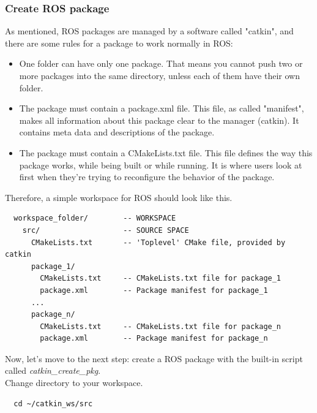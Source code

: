 \documentclass[pdftex,12pt,a4paper]{article}
\begin{document}
  \subsubsection{Create ROS package}  
  As mentioned, ROS packages are managed by a software called "catkin", and there are some rules for a package to work normally in ROS:
  \begin{itemize}
  \item One folder can have only one package. That means you cannot push two or more packages into the same directory, unless each of them have their own folder.
  \item The package must contain a package.xml file. This file, as called "manifest", makes all information about this package clear to the manager (catkin). It contains meta data and descriptions of the package.
  \item The package must contain a CMakeLists.txt file. This file defines the way this package works, while being built or while running. It is where users look at first when they're trying to reconfigure the behavior of the package.
  \end{itemize}
  Therefore, a simple workspace for ROS should look like this.
  \begin{lstlisting}
  workspace_folder/        -- WORKSPACE
    src/                   -- SOURCE SPACE
      CMakeLists.txt       -- 'Toplevel' CMake file, provided by catkin
      package_1/
        CMakeLists.txt     -- CMakeLists.txt file for package_1
        package.xml        -- Package manifest for package_1
      ...
      package_n/
        CMakeLists.txt     -- CMakeLists.txt file for package_n
        package.xml        -- Package manifest for package_n
  \end{lstlisting}
  Now, let's move to the next step: create a ROS package with the built-in script called \textit{catkin\_create\_pkg}.\\
  Change directory to your workspace.
  \begin{lstlisting}
  cd ~/catkin_ws/src
  \end{lstlisting}
  
\end{document}
